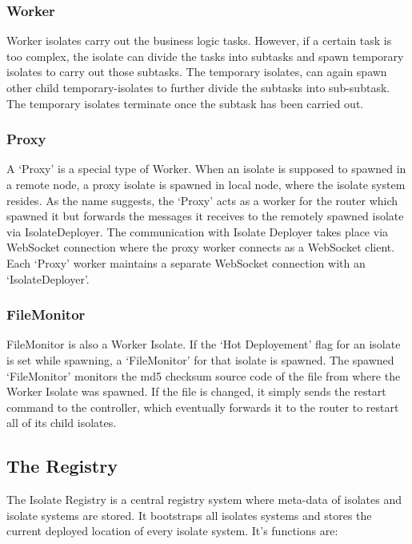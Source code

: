   \subsubsection{Worker}
  Worker isolates carry out the business logic tasks. However, if a certain task is too complex, the isolate can divide the tasks into subtasks and spawn temporary isolates to carry out those subtasks. The temporary isolates, can again spawn other child temporary-isolates to further divide the subtasks into sub-subtask. The temporary isolates terminate once the subtask has been carried out.

  \subsubsection{Proxy}
  A ‘Proxy’ is a special type of Worker. When an isolate is supposed to spawned in a remote node, a proxy isolate is spawned in local node, where the isolate system resides. As the name suggests, the ‘Proxy’ acts as a worker for the router which spawned it but forwards the messages it receives to the remotely spawned isolate via IsolateDeployer. The communication with Isolate Deployer takes place via WebSocket connection where the proxy worker connects as a WebSocket client. Each ‘Proxy’ worker maintains a separate WebSocket connection with an ‘IsolateDeployer’.

  \subsubsection{FileMonitor}
  FileMonitor is also a Worker Isolate. If the ‘Hot Deployement’ flag for an isolate is set while spawning, a ‘FileMonitor’ for that isolate is spawned. The spawned ‘FileMonitor’ monitors the md5 checksum source code of the file from where the Worker Isolate was spawned. If the file is changed, it simply sends the restart command to the controller, which eventually forwards it to the router to restart all of its child isolates.


\subsection{The Registry}
The Isolate Registry is a central registry system where meta-data of isolates and isolate systems are stored. It bootstraps all isolates systems and stores the current deployed location of every isolate system. It’s functions are:
